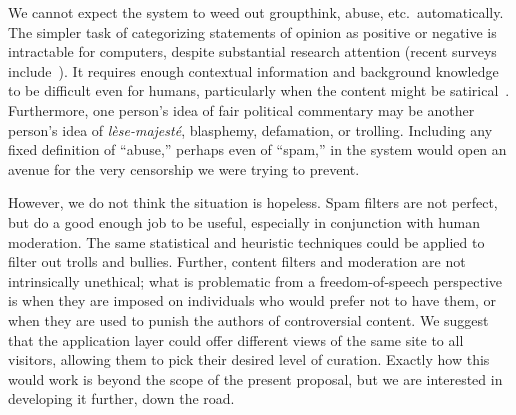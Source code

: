 \documentclass[oneside]{zarticle}
\begin{document}
\begin{multicols}{2}
We cannot expect the system to weed out groupthink, abuse,
etc.\ automatically.  The simpler task of categorizing statements of
opinion as positive or negative is intractable for computers, despite
substantial research attention (recent surveys
include~\textcite{liu2012mining,pang2008mining}).  It requires enough
contextual information and background knowledge to be difficult even
for humans, particularly when the content might be
satirical~\cite{lamarre2009satire}.  Furthermore, one person's idea of
fair political commentary may be another person's idea of
\textit{lèse-majesté}, blasphemy, defamation, or trolling.  Including
any fixed definition of “abuse,” perhaps even of “spam,” in the system
would open an avenue for the very censorship we were trying to
prevent.

However, we do not think the situation is hopeless.  Spam filters are
not perfect, but do a good enough job to be useful, especially in
conjunction with human moderation.  The same statistical and heuristic
techniques could be applied to filter out trolls and bullies.
Further, content filters and moderation are not intrinsically
unethical; what is problematic from a freedom-of-speech perspective is
when they are imposed on individuals who would prefer not to have
them, or when they are used to punish the authors of controversial
content.  We suggest that the application layer could offer different
views of the same site to all visitors, allowing them to pick their
desired level of curation.  Exactly how this would work is beyond the
scope of the present proposal, but we are interested in developing it
further, down the road.

\printbibliography
\end{multicols}
\end{document}
